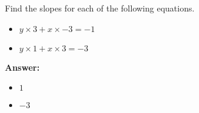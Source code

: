  Find the slopes for each of the following equations. \begin{itemize}\item \( y \times 3 + x \times -3 = -1 \)\item \( y \times 1 + x \times 3 = -3 \)\end{itemize}

        \textbf{Answer:} \begin{itemize}\item \( 1 \)\item \( -3 \)\end{itemize}
